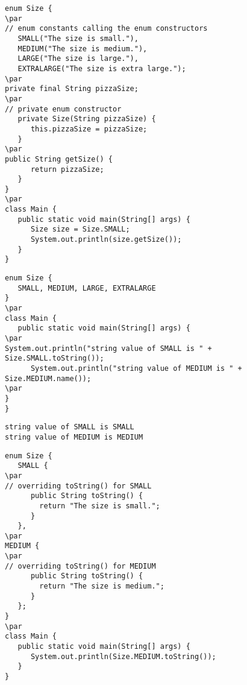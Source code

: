 \documentclass{book}
\def\lthtmlcheckvsize{\ifdim\ht\sizebox<\vsize 
  \ifdim\wd\sizebox<\hsize\expandafter\hfill\fi \expandafter\vfill
  \else\expandafter\vss\fi}%
\begin{document}
{\newpage\clearpage
{}%
\begin{lstlisting}
enum Size {
\par
// enum constants calling the enum constructors 
   SMALL("The size is small."),
   MEDIUM("The size is medium."),
   LARGE("The size is large."),
   EXTRALARGE("The size is extra large.");
\par
private final String pizzaSize;
\par
// private enum constructor
   private Size(String pizzaSize) {
      this.pizzaSize = pizzaSize;
   }
\par
public String getSize() {
      return pizzaSize;
   }
}
\par
class Main {
   public static void main(String[] args) {
      Size size = Size.SMALL;
      System.out.println(size.getSize());
   }
}
\end{lstlisting}%
\lthtmlfigureZ
\lthtmlcheckvsize\clearpage}

{\newpage\clearpage
{}%
\begin{lstlisting}
enum Size {
   SMALL, MEDIUM, LARGE, EXTRALARGE
}
\par
class Main {
   public static void main(String[] args) {
\par
System.out.println("string value of SMALL is " + Size.SMALL.toString());
      System.out.println("string value of MEDIUM is " + Size.MEDIUM.name());
\par
}
}
\end{lstlisting}%
\lthtmlfigureZ
\lthtmlcheckvsize\clearpage}

{\newpage\clearpage
{}%
\begin{lstlisting}
string value of SMALL is SMALL
string value of MEDIUM is MEDIUM
\end{lstlisting}%
\lthtmlfigureZ
\lthtmlcheckvsize\clearpage}

{\newpage\clearpage
{}%
\begin{lstlisting}
enum Size {
   SMALL {
\par
// overriding toString() for SMALL
      public String toString() {
        return "The size is small.";
      }
   },
\par
MEDIUM {
\par
// overriding toString() for MEDIUM
      public String toString() {
        return "The size is medium.";
      }
   };
}
\par
class Main {
   public static void main(String[] args) {
      System.out.println(Size.MEDIUM.toString());
   }
}
\end{lstlisting}%
\lthtmlfigureZ
\lthtmlcheckvsize\clearpage}

\end{document}
